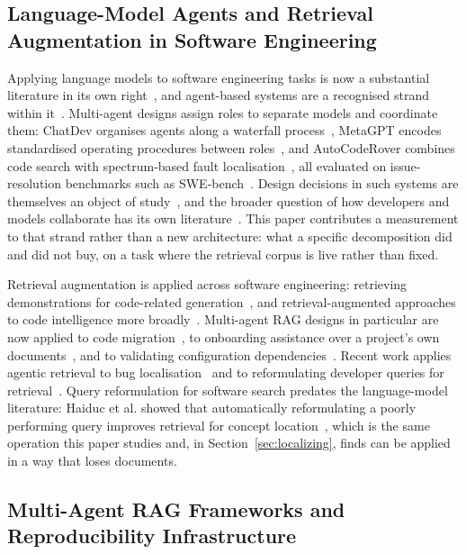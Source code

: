 \documentclass[acmsmall,review,anonymous,screen]{acmart}
\begin{document}
\subsection{Language-Model Agents and Retrieval Augmentation in Software Engineering}

Applying language models to software engineering tasks is now a substantial
literature in its own right~\cite{fan2023llmse,hou2024llm4se}, and agent-based
systems are a recognised strand within it~\cite{liu2026agentsurvey}. Multi-agent
designs assign roles to separate models and coordinate them: ChatDev organises
agents along a waterfall process~\cite{qian2024chatdev}, MetaGPT encodes
standardised operating procedures between roles~\cite{hong2024metagpt}, and
AutoCodeRover combines code search with spectrum-based fault
localisation~\cite{zhang2024autocoderover}, all evaluated on issue-resolution
benchmarks such as SWE-bench~\cite{jimenez2024swebench}. Design decisions in such
systems are themselves an object of study~\cite{batole2025designissue}, and the
broader question of how developers and models collaborate has its own
literature~\cite{liang2024survey,barke2023copilot,stray2025humanai,treude2025taxonomy}.
This paper contributes a measurement to that strand rather than a new
architecture: what a specific decomposition did and did not buy, on a task where
the retrieval corpus is live rather than fixed.

Retrieval augmentation is applied across software engineering: retrieving
demonstrations for code-related generation~\cite{nashid2023retrieval}, and
retrieval-augmented approaches to code intelligence more
broadly~\cite{yang2025ragcode}. Multi-agent RAG designs in particular are now
applied to code migration~\cite{lu2026comra}, to onboarding assistance over a
project's own documents~\cite{ionescu2025onboarding}, and to validating
configuration dependencies~\cite{simon2025configdep}. Recent work applies agentic retrieval to bug
localisation~\cite{mamun2026blagent} and to reformulating developer queries for
retrieval~\cite{caumartin2026reformulate}. Query reformulation for software search
predates the language-model literature: Haiduc et al. showed that automatically
reformulating a poorly performing query improves retrieval for concept
location~\cite{haiduc2013reformulation}, which is the same operation this paper
studies and, in Section~\ref{sec:localizing}, finds can be applied in a way that
loses documents.

\subsection{Multi-Agent RAG Frameworks and Reproducibility Infrastructure}
\end{document}
